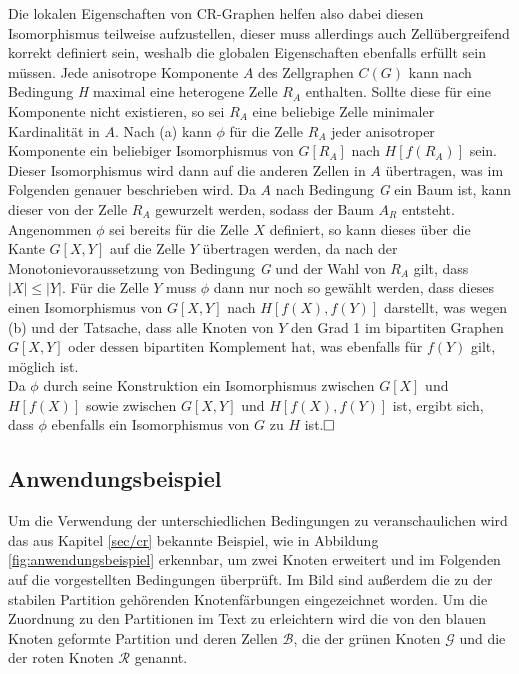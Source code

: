 Die lokalen Eigenschaften von CR-Graphen helfen also dabei diesen Isomorphismus teilweise aufzustellen, dieser muss allerdings auch Zellübergreifend korrekt definiert sein, weshalb die globalen Eigenschaften ebenfalls erfüllt sein müssen.
Jede anisotrope Komponente $A$ des Zellgraphen $C(G)$ kann nach Bedingung \emph{H} maximal eine heterogene Zelle $R_A$ enthalten.
Sollte diese für eine Komponente nicht existieren, so sei $R_A$ eine beliebige Zelle minimaler Kardinalität in $A$.
Nach (a) kann $\phi$ für die Zelle $R_A$ jeder anisotroper Komponente ein beliebiger Isomorphismus von $G[R_A]$ nach $H[f(R_A)]$ sein.
Dieser Isomorphismus wird dann auf die anderen Zellen in $A$ übertragen, was im Folgenden genauer beschrieben wird.
Da $A$ nach Bedingung \emph{G} ein Baum ist, kann dieser von der Zelle $R_A$ gewurzelt werden, sodass der Baum $A_R$ entsteht.
Angenommen $\phi$ sei bereits für die Zelle $X$ definiert, so kann dieses über die Kante $G[X,Y]$ auf die Zelle $Y$ übertragen werden, da nach der Monotonievoraussetzung von Bedingung \emph{G} und der Wahl von $R_A$ gilt, dass $|X|\leq |Y|$.
Für die Zelle $Y$ muss $\phi$ dann nur noch so gewählt werden, dass dieses einen Isomorphismus von $G[X,Y]$ nach $H[f(X),f(Y)]$ darstellt, was wegen (b) und der Tatsache, dass alle Knoten von $Y$ den Grad 1 im bipartiten Graphen $G[X,Y]$ oder dessen bipartiten Komplement hat, was ebenfalls für $f(Y)$ gilt, möglich ist.\\

Da $\phi$ durch seine Konstruktion ein Isomorphismus zwischen $G[X]$ und $H[f(X)]$ sowie zwischen $G[X,Y]$ und $H[f(X),f(Y)]$ ist, ergibt sich, dass $\phi$ ebenfalls ein Isomorphismus von $G$ zu $H$ ist.$\hfill\square$

\subsection{Anwendungsbeispiel}
\label{sec/anwendungsbeispiel}
Um die Verwendung der unterschiedlichen Bedingungen zu veranschaulichen wird das aus Kapitel \ref{sec/cr} bekannte Beispiel, wie in Abbildung \ref{fig:anwendungsbeispiel} erkennbar, um zwei Knoten erweitert und im Folgenden auf die vorgestellten Bedingungen überprüft.
Im Bild sind außerdem die zu der stabilen Partition gehörenden Knotenfärbungen eingezeichnet worden.
Um die Zuordnung zu den Partitionen im Text zu erleichtern wird die von den blauen Knoten geformte Partition und deren Zellen $\mathcal{B}$, die der grünen Knoten $\mathcal{G}$ und die der roten Knoten $\mathcal{R}$ genannt.

